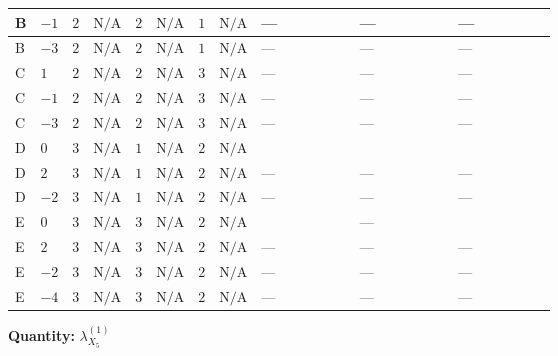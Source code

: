 \documentclass[8pt]{article}
\begin{document}
\begin{landscape}
\begin{longtable}{@{}llcccccc >{\raggedright\arraybackslash}p{0.21\linewidth} >{\raggedright\arraybackslash}p{0.21\linewidth} >{\raggedright\arraybackslash}p{0.21\linewidth}@{}}
\midrule
B & $-1$ & $2$ & $\text{N/A}$ & $2$ & $\text{N/A}$ & $1$ & $\text{N/A}$ & --- & --- & --- \\
\midrule
B & $-3$ & $2$ & $\text{N/A}$ & $2$ & $\text{N/A}$ & $1$ & $\text{N/A}$ & --- & --- & --- \\
\midrule
C & $1$ & $2$ & $\text{N/A}$ & $2$ & $\text{N/A}$ & $3$ & $\text{N/A}$ & --- & --- & --- \\
\midrule
C & $-1$ & $2$ & $\text{N/A}$ & $2$ & $\text{N/A}$ & $3$ & $\text{N/A}$ & --- & --- & --- \\
\midrule
C & $-3$ & $2$ & $\text{N/A}$ & $2$ & $\text{N/A}$ & $3$ & $\text{N/A}$ & --- & --- & --- \\
\midrule
D & $0$ & $3$ & $\text{N/A}$ & $1$ & $\text{N/A}$ & $2$ & $\text{N/A}$ & \scriptsize\adjustbox{max width=\linewidth}{$\begin{gathered} 4 \left({\lambda_5}\right)^{*} \left({\lambda_{X_{14}}}\right)^{*}\end{gathered}$} & \scriptsize\adjustbox{max width=\linewidth}{$\begin{gathered} +40 {\lambda_{X_{6}}} \left({\lambda_{X_{5}}^{(1)}}\right)^{*}\end{gathered}$} & \scriptsize\adjustbox{max width=\linewidth}{$\begin{gathered} -12 {g_2}^2 {\lambda_{X_{5}}^{(1)}}\end{gathered}$} \\
\midrule
D & $2$ & $3$ & $\text{N/A}$ & $1$ & $\text{N/A}$ & $2$ & $\text{N/A}$ & --- & --- & --- \\
\midrule
D & $-2$ & $3$ & $\text{N/A}$ & $1$ & $\text{N/A}$ & $2$ & $\text{N/A}$ & --- & --- & --- \\
\midrule
E & $0$ & $3$ & $\text{N/A}$ & $3$ & $\text{N/A}$ & $2$ & $\text{N/A}$ & \scriptsize\adjustbox{max width=\linewidth}{$\begin{gathered} 2 \left({\lambda_5}\right)^{*} \left({\lambda_{X_{14}}}\right)^{*}\end{gathered}$} & --- & \scriptsize\adjustbox{max width=\linewidth}{$\begin{gathered} -24 {g_2}^2 {\lambda_{X_{5}}^{(1)}}\end{gathered}$} \\
\midrule
E & $2$ & $3$ & $\text{N/A}$ & $3$ & $\text{N/A}$ & $2$ & $\text{N/A}$ & --- & --- & --- \\
\midrule
E & $-2$ & $3$ & $\text{N/A}$ & $3$ & $\text{N/A}$ & $2$ & $\text{N/A}$ & --- & --- & --- \\
\midrule
E & $-4$ & $3$ & $\text{N/A}$ & $3$ & $\text{N/A}$ & $2$ & $\text{N/A}$ & --- & --- & --- \\
\midrule
\bottomrule
\end{longtable}
\clearpage
\noindent\textbf{Quantity: }${\lambda_{X_{5}}^{(1)}}$\par\smallskip

\end{landscape}
\end{document}
